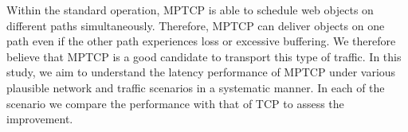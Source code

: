 Within the standard operation, MPTCP is able to schedule web objects on different paths simultaneously. 
Therefore, MPTCP can deliver objects on one path even if the other path
experiences loss or excessive buffering. We therefore believe that MPTCP is a good candidate 
to transport this type of traffic. In this study, we aim to understand the latency performance of MPTCP
under various plausible network and traffic scenarios in a systematic manner. In each of the scenario 
we compare the performance with that of TCP to assess the improvement.


